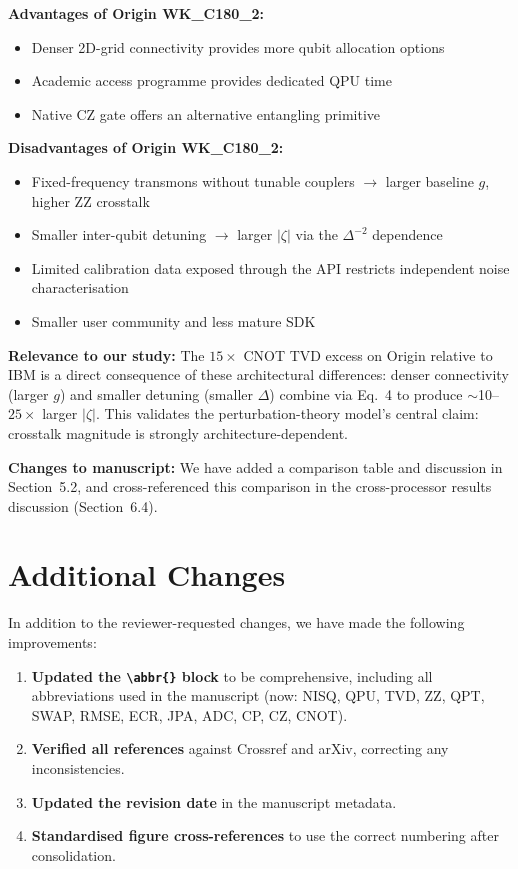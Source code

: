 \documentclass[11pt,a4paper]{article}
\begin{document}
\noindent\textbf{Advantages of Origin WK\_C180\_2:}
\begin{itemize}[leftmargin=*]
    \item Denser 2D-grid connectivity provides more qubit allocation options
    \item Academic access programme provides dedicated QPU time
    \item Native CZ gate offers an alternative entangling primitive
\end{itemize}

\noindent\textbf{Disadvantages of Origin WK\_C180\_2:}
\begin{itemize}[leftmargin=*]
    \item Fixed-frequency transmons without tunable couplers $\rightarrow$ larger baseline
    $g$, higher ZZ crosstalk
    \item Smaller inter-qubit detuning $\rightarrow$ larger $|\zeta|$ via the $\Delta^{-2}$
    dependence
    \item Limited calibration data exposed through the API restricts independent noise
    characterisation
    \item Smaller user community and less mature SDK
\end{itemize}

\medskip\noindent\textbf{Relevance to our study:} The $15\times$ CNOT TVD excess on Origin
relative to IBM is a direct consequence of these architectural differences: denser
connectivity (larger $g$) and smaller detuning (smaller $\Delta$) combine via Eq.~4 to
produce $\sim$10--$25\times$ larger $|\zeta|$. This validates the perturbation-theory
model's central claim: crosstalk magnitude is strongly architecture-dependent.

\medskip\noindent\textbf{Changes to manuscript:} We have added a comparison table and
discussion in Section~5.2, and cross-referenced this comparison in the cross-processor
results discussion (Section~6.4).

\section*{Additional Changes}

In addition to the reviewer-requested changes, we have made the following improvements:

\begin{enumerate}[leftmargin=*]
    \item \textbf{Updated the \texttt{\textbackslash abbr\{\}} block} to be comprehensive,
    including all abbreviations used in the manuscript (now: NISQ, QPU, TVD, ZZ, QPT,
    SWAP, RMSE, ECR, JPA, ADC, CP, CZ, CNOT).
    \item \textbf{Verified all references} against Crossref and arXiv, correcting any
    inconsistencies.
    \item \textbf{Updated the revision date} in the manuscript metadata.
    \item \textbf{Standardised figure cross-references} to use the correct numbering after
    consolidation.
\end{enumerate}
\end{document}
